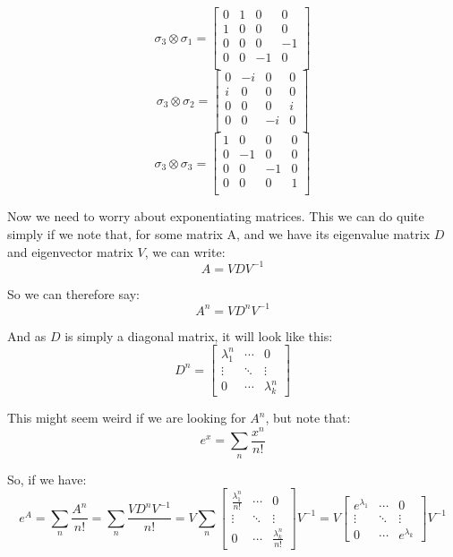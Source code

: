 \documentclass{article}
\begin{document}
\[ \sigma_3 \otimes \sigma_1 = \left[
    \begin{array}{cccc}
    0 & 1 & 0 & 0 \\
    1 & 0 & 0 & 0 \\
    0 & 0 & 0 & -1 \\
    0 & 0 & -1 & 0 \\
    \end{array}
    \right] \]
\[ \sigma_3 \otimes \sigma_2 = \left[
    \begin{array}{cccc}
    0 & -\textit{i} & 0 & 0 \\
    \textit{i} & 0 & 0 & 0 \\
    0 & 0 & 0 & \textit{i} \\
    0 & 0 & -\textit{i} & 0 \\
    \end{array}
    \right] \]
\[ \sigma_3 \otimes \sigma_3 = \left[
    \begin{array}{cccc}
    1 & 0 & 0 & 0 \\
    0 & -1 & 0 & 0 \\
    0 & 0 & -1 & 0 \\
    0 & 0 & 0 & 1 \\
    \end{array}
    \right] \]

Now we need to worry about exponentiating matrices. This we can do quite simply if we note that, for some matrix A, and we have its eigenvalue matrix $D$ and eigenvector matrix $V$, we can write:
\[ A = VDV^{-1} \]

So we can therefore say:
\[ A^n = VD^nV^{-1} \]

And as $D$ is simply a diagonal matrix, it will look like this: 
\[ D^n = \begin{bmatrix}
    \lambda_1^n & \cdots & 0 \\
    \vdots & \ddots & \vdots \\ 
    0 & \cdots & \lambda_k^n
\end{bmatrix} \]

This might seem weird if we are looking for $A^n$, but note that: 
\[ e^x = \sum_n \frac{x^n}{n!} \]

So, if we have:
\[ e^A = \sum_n \frac{A^n}{n!} = \sum_n \frac{VD^nV^{-1}}{n!} = V \sum_n \begin{bmatrix}
    \frac{\lambda_1^n}{n!} & \cdots & 0 \\
    \vdots & \ddots & \vdots \\ 
    0 & \cdots & \frac{\lambda_k^n}{n!}
\end{bmatrix}  V^{-1} = V\begin{bmatrix}
    e^{\lambda_1} & \cdots & 0 \\
    \vdots & \ddots & \vdots \\ 
    0 & \cdots & e^{\lambda_k}
\end{bmatrix}V^{-1}\]
\end{document}
